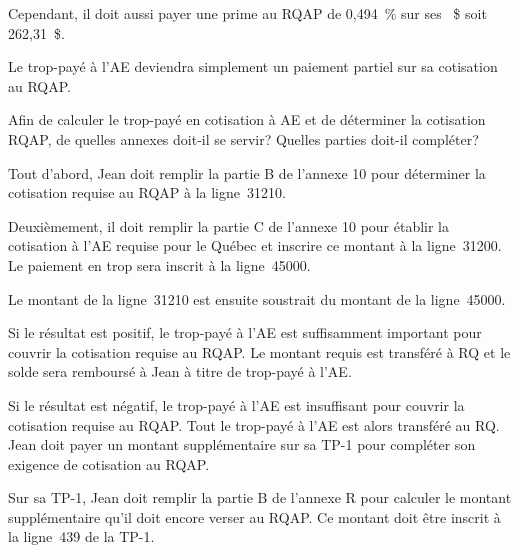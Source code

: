 Cependant, il doit aussi payer une prime au RQAP de 0,494~\% sur ses ~\$ soit 262,31~\$.

Le trop-payé à l'AE deviendra simplement un paiement partiel sur sa cotisation au RQAP.

\begin{sousQuestion}
	Afin de calculer le trop-payé en cotisation à AE et de déterminer la cotisation RQAP, de quelles annexes doit-il se servir? Quelles parties doit-il compléter?
\end{sousQuestion}
Tout d'abord, Jean doit remplir la partie B de l'annexe 10 pour déterminer la cotisation requise au RQAP à la ligne~31210.

Deuxièmement, il doit remplir la partie C de l'annexe 10 pour établir la cotisation à l'AE requise pour le Québec et inscrire ce montant à la ligne~31200. Le paiement en trop sera inscrit à la ligne~45000.

Le montant de la ligne~31210 est ensuite soustrait du montant de la ligne~45000.

Si le résultat est positif, le trop-payé à l'AE est suffisamment important pour couvrir la cotisation requise au RQAP. Le montant requis est transféré à RQ et le solde sera remboursé à Jean à titre de trop-payé à l'AE.

Si le résultat est négatif, le trop-payé à l'AE est insuffisant pour couvrir la cotisation requise au RQAP. Tout le trop-payé à l'AE est alors transféré au RQ. Jean doit payer un montant supplémentaire sur sa TP-1 pour compléter son exigence de cotisation au RQAP.

Sur sa TP-1, Jean doit remplir la partie B de l'annexe R pour calculer le montant supplémentaire qu'il doit encore verser au RQAP. Ce montant doit être inscrit à la ligne~439 de la TP-1.

